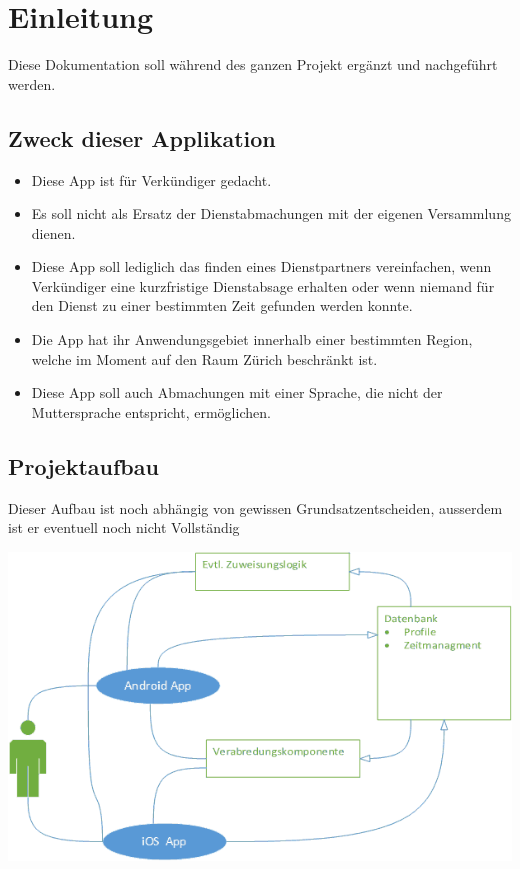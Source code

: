 \chapter{Einleitung}

Diese Dokumentation soll während des ganzen Projekt ergänzt und nachgeführt werden.
\section{Zweck dieser Applikation}
\begin{itemize}
\item Diese App ist für Verkündiger gedacht.
\item Es soll nicht als Ersatz der Dienstabmachungen mit der eigenen Versammlung dienen.
\item Diese App soll lediglich das finden eines Dienstpartners vereinfachen, wenn Verkündiger eine kurzfristige Dienstabsage erhalten oder wenn niemand für den Dienst zu einer bestimmten Zeit gefunden werden konnte.
\item Die App hat ihr Anwendungsgebiet innerhalb einer bestimmten Region, welche im Moment auf den Raum Zürich beschränkt ist.
\item Diese App soll auch Abmachungen mit einer Sprache, die nicht der Muttersprache entspricht, ermöglichen.
\end{itemize}

\section{Projektaufbau}

Dieser Aufbau ist noch abhängig von gewissen Grundsatzentscheiden, ausserdem ist er eventuell noch nicht Vollständig 

\includegraphics{bilder/useCase.png}
